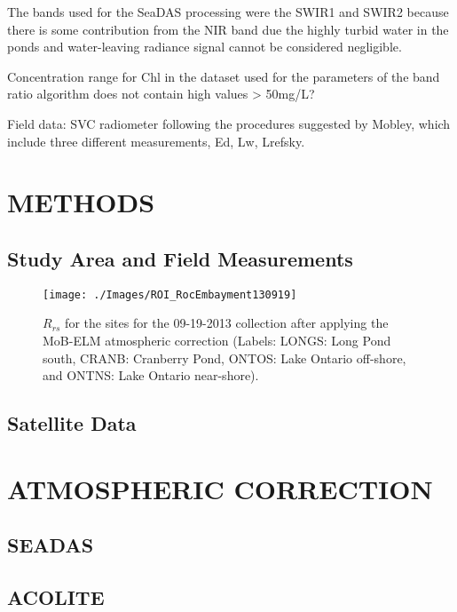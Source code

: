 \documentclass[]{spie}  %
\begin{document}
The bands used for the SeaDAS processing were the SWIR1 and SWIR2 because there is some contribution from the NIR band due the highly turbid water in the ponds and water-leaving radiance signal cannot be considered negligible.

Concentration range for Chl in the dataset used for the parameters of the band ratio algorithm does not contain high values > 50mg/L?

Field data: SVC radiometer following the procedures suggested by Mobley, which include three different measurements, Ed, Lw, Lrefsky.

\section{METHODS}
\label{sec:methods}
\subsection{Study Area and Field Measurements}
\begin{figure}[htbp!]
  \centering
  \texttt{[image: ./Images/ROI\_RocEmbayment130919]}
  \caption{$R_{rs}$ for the sites for the 09-19-2013 collection after applying the MoB-ELM atmospheric correction (Labels: LONGS: Long Pond south, CRANB: Cranberry Pond, ONTOS: Lake Ontario off-shore, and ONTNS: Lake Ontario near-shore).\label{fig:RrsROIs130919} } 
\end{figure}

\subsection{Satellite Data}


\section{ATMOSPHERIC CORRECTION}
\label{sec:atmcorr}  %
\subsection{SEADAS}
\subsection{ACOLITE}
\end{document}
